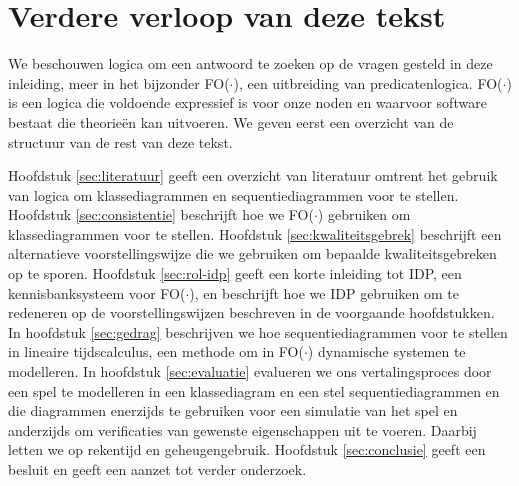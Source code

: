 \section{Verdere verloop van deze tekst}

We beschouwen logica om een antwoord te zoeken op de vragen gesteld in deze inleiding, meer in het bijzonder FO($\cdot$)\cite{DeCatBroes2014PLaa}, een uitbreiding van predicatenlogica. FO($\cdot$) is een logica die voldoende expressief is voor onze noden en waarvoor software bestaat die theorie\"en kan uitvoeren. We geven eerst een overzicht van de structuur van de rest van deze tekst.

Hoofdstuk \ref{sec:literatuur} geeft een overzicht van literatuur omtrent het gebruik van logica om klassediagrammen en sequentiediagrammen voor te stellen. Hoofdstuk \ref{sec:consistentie} beschrijft hoe we FO($\cdot$) gebruiken om klassediagrammen voor te stellen. Hoofdstuk \ref{sec:kwaliteitsgebrek} beschrijft een alternatieve voorstellingswijze die we gebruiken om bepaalde kwaliteitsgebreken op te sporen. Hoofdstuk \ref{sec:rol-idp} geeft een korte inleiding tot IDP\cite{DeCatBroes2014PLaa}, een kennisbanksysteem voor FO($\cdot$), en beschrijft hoe we IDP gebruiken om te redeneren op de voorstellingswijzen beschreven in de voorgaande hoofdstukken. In hoofdstuk \ref{sec:gedrag} beschrijven we hoe sequentiediagrammen voor te stellen in lineaire tijdscalculus\cite{BogaertsBart2014Sdsu}, een methode om in FO($\cdot$) dynamische systemen te modelleren. In hoofdstuk \ref{sec:evaluatie} evalueren we ons vertalingsproces door een spel te modelleren in een klassediagram en een stel sequentiediagrammen en die diagrammen enerzijds te gebruiken voor een simulatie van het spel en anderzijds om verificaties van gewenste eigenschappen uit te voeren. Daarbij letten we op rekentijd en geheugengebruik. Hoofdstuk \ref{sec:conclusie} geeft een besluit en geeft een aanzet tot verder onderzoek.